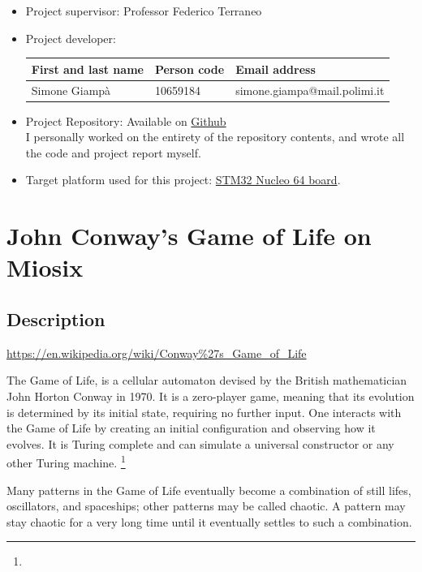 \documentclass[10pt]{article}
\begin{document}
    \begin{itemize}
        \item
        Project supervisor: Professor Federico Terraneo
        \item
        Project developer:
        \begin{center}
            \begin{tabular}{lll}
                First and last name & Person code & Email address\\
                \hline
                Simone Giampà & 10659184 & simone.giampa@mail.polimi.it \\
            \end{tabular}
        \end{center}

        \item
        Project Repository: Available on \href{https://github.com/SimonGiampy/STM32-Miosix-GameOfLife}{Github} \\
        I personally worked on the entirety of the repository contents, and wrote all the code and project report myself.

        \item Target platform used for this project: \href{https://www.st.com/en/evaluation-tools/nucleo-f401re.html}{STM32 Nucleo 64 board}.
    \end{itemize}


    \section{John Conway's Game of Life on Miosix}

    \subsection{Description }

    \urldef{\wikiUrl}\url{https://en.wikipedia.org/wiki/Conway\%27s_Game_of_Life}

    The Game of Life, is a cellular automaton devised by the British mathematician John Horton Conway in 1970.
    It is a zero-player game, meaning that its evolution is determined by its initial state, requiring no further input.
    One interacts with the Game of Life by creating an initial configuration and observing how it evolves.
    It is Turing complete and can simulate a universal constructor or any other Turing machine. \footnote{\wikiUrl }

    Many patterns in the Game of Life eventually become a combination of still lifes, oscillators, and spaceships; other patterns may be called chaotic. A pattern may stay chaotic for a very long time until it eventually settles to such a combination.
\end{document}

